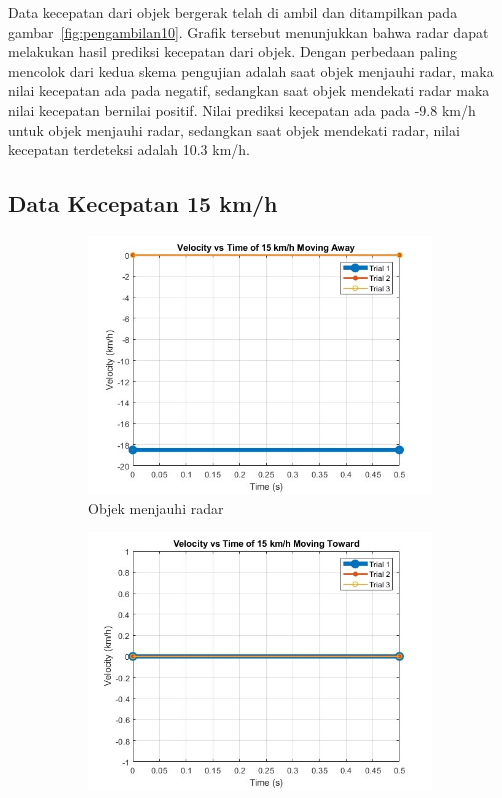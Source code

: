Data kecepatan dari objek bergerak telah di ambil dan ditampilkan pada gambar~\ref{fig:pengambilan10}. Grafik tersebut menunjukkan bahwa radar dapat melakukan hasil prediksi kecepatan dari objek. Dengan perbedaan paling mencolok dari kedua skema pengujian adalah saat objek menjauhi radar, maka nilai kecepatan ada pada negatif, sedangkan saat objek mendekati radar maka nilai kecepatan bernilai positif. Nilai prediksi kecepatan ada pada -9.8 km/h untuk objek menjauhi radar, sedangkan saat objek mendekati radar, nilai kecepatan terdeteksi adalah 10.3 km/h.

\subsection{Data Kecepatan 15 km/h}

\begin{figure}
    \centering
    \begin{subfigure}[b]{0.45\textwidth}
        \centering
		\includegraphics[scale=0.4]{pics/bab5/Velocity/15MA.jpg}
		\caption{Objek menjauhi radar}
		\label{fig:pengambilan15MA}
    \end{subfigure}
    \hfill
    \begin{subfigure}[b]{0.45\textwidth}
        \centering
		\includegraphics[scale=0.4]{pics/bab5/Velocity/15MT.jpg}

\end{subfigure}
\end{figure}
